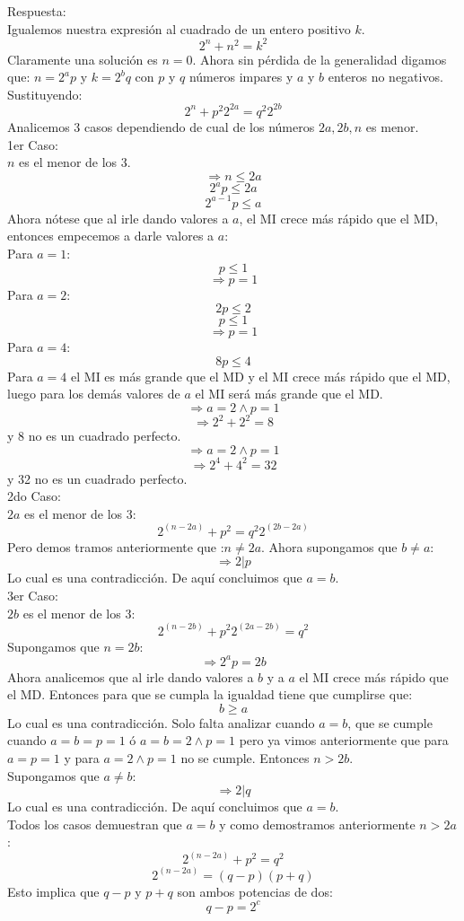 \documentclass{book}
\begin{document}
\begin{enumerate}
			Respuesta:\\
			Igualemos nuestra expresión al cuadrado de un entero positivo $k$. 
			$$2^n+n^2=k^2$$
Claramente una solución es $n=0$.
Ahora sin pérdida de la generalidad digamos que: $n=2^a p$ y $k=2^b q$ con $p$ y $q$ números impares y $a$ y $b$ enteros no negativos.\\
Sustituyendo:
$$2^n+p^2 2^{2a}=q^2 2^{2b}$$
Analicemos 3 casos dependiendo de cual de los números $2a, 2b,n$ es menor.\\
1er Caso:\\
$n$ es el menor de los 3.
$$\Rightarrow n\leq 2a$$
$$2^ap\leq 2a$$
$$2^{a-1}p\leq a$$
Ahora nótese que al irle dando valores a $a$, el MI crece más rápido que el MD, entonces empecemos a darle valores a $a$:\\
Para $a=1$:
$$p\leq 1$$
$$\Rightarrow p=1$$
Para $a=2$:
$$2p\leq 2$$
$$p\leq 1$$
$$\Rightarrow p=1$$
Para $a=4$:
$$8p\leq 4$$
Para $a=4$ el MI es más grande que el MD y el MI crece más rápido que el MD, luego para los demás valores de $a$ el MI será más grande que el MD. 
$$\Rightarrow a=2\wedge p=1$$
$$\Rightarrow 2^2+2^2=8$$
y 8 no es un cuadrado perfecto.\\
$$\Rightarrow a=2\wedge p=1$$
$$\Rightarrow 2^4+4^2=32$$
y 32 no es un cuadrado perfecto.\\
2do Caso:\\
$2a$ es el menor de los 3:
$$2^{(n-2a)}+p^2=q^2 2^{(2b-2a)}$$
Pero demos tramos anteriormente que :$n\neq 2a$. Ahora supongamos que $b\neq a$:
$$\Rightarrow 2|p$$
Lo cual es una contradicción. De aquí concluimos que $a=b$.\\
3er Caso:\\
$2b$ es el menor de los 3:
$$2^{(n-2b)}+p^2 2^{(2a-2b)}=q^2$$
Supongamos que $n=2b$:
$$\Rightarrow 2^ap=2b$$
Ahora analicemos que al irle dando valores a $b$ y a $a$  el MI crece más rápido que el MD. Entonces para que se cumpla la igualdad tiene que cumplirse que:
$$b\geq a$$ 
Lo cual es una contradicción. Solo falta analizar cuando $a=b$, que se cumple cuando $a=b=p=1$ ó $a=b=2\wedge p=1$ pero ya vimos anteriormente que para $a=p=1$ y para $a=2\wedge p=1$ no se cumple. Entonces $n>2b$. \\
Supongamos que $a\neq b$:
$$\Rightarrow 2|q$$
Lo cual es una contradicción. De aquí concluimos que $a=b$.\\
Todos los casos demuestran que $a=b$ y como demostramos anteriormente $n>2a$:
$$2^{(n-2a)}+p^2=q^2$$
$$2^{(n-2a)}=(q-p)(p+q)$$
Esto implica que $q-p$ y $p+q$ son ambos potencias de dos:
$$q-p=2^c$$

\end{enumerate}
\end{document}
